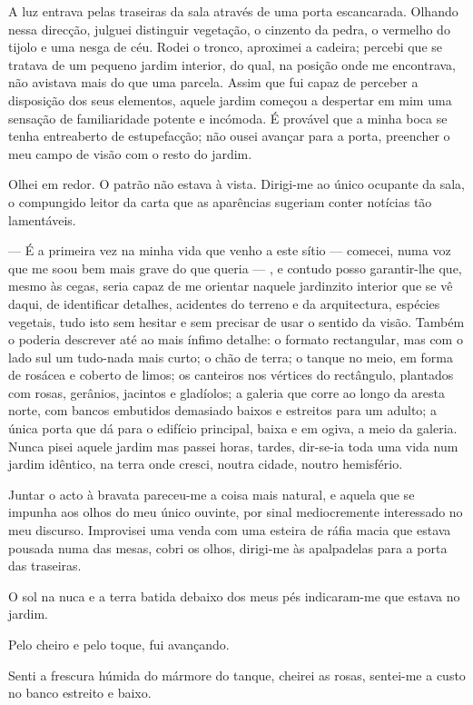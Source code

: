 A luz entrava pelas traseiras da sala através de uma porta escancarada.
Olhando nessa direcção, julguei distinguir vegetação, o cinzento da
pedra, o vermelho do tijolo e uma nesga de céu. Rodei o tronco,
aproximei a cadeira; percebi que se tratava de um pequeno jardim
interior, do qual, na posição onde me encontrava, não avistava mais do
que uma parcela. Assim que fui capaz de perceber a disposição dos seus
elementos, aquele jardim começou a despertar em mim uma sensação de
familiaridade potente e incómoda. É provável que a minha boca se tenha
entreaberto de estupefacção; não ousei avançar para a porta, preencher o
meu campo de visão com o resto do jardim.

Olhei em redor. O patrão não estava à vista. Dirigi-me ao único ocupante
da sala, o compungido leitor da carta que as aparências sugeriam conter
notícias tão lamentáveis.

--- É a primeira vez na minha vida que venho a este sítio
--- comecei, numa voz que me soou bem mais grave do que queria --- , e
  contudo posso garantir-lhe que, mesmo às cegas, seria capaz de me
  orientar naquele jardinzito interior que se vê daqui, de identificar
  detalhes, acidentes do terreno e da arquitectura, espécies vegetais,
  tudo isto sem hesitar e sem precisar de usar o sentido da visão.
  Também o poderia descrever até ao mais ínfimo detalhe: o formato
  rectangular, mas com o lado sul um tudo-nada mais curto; o
  chão de terra; o tanque no meio, em forma
de rosácea e coberto de limos; os canteiros nos vértices do rectângulo,
plantados com rosas, gerânios, jacintos e gladíolos; a galeria que corre
ao longo da aresta norte, com bancos embutidos demasiado baixos e
estreitos para um adulto; a única porta que dá para o edifício
principal, baixa e em ogiva, a meio da galeria. Nunca pisei aquele
jardim mas passei horas, tardes, dir-se-ia toda uma vida num jardim
idêntico, na terra onde cresci, noutra cidade, noutro hemisfério.

Juntar o acto à bravata pareceu-me a coisa mais natural, e aquela que se
impunha aos olhos do meu único ouvinte, por sinal mediocremente
interessado no meu discurso. Improvisei uma venda com uma esteira de
ráfia macia que estava pousada numa das mesas, cobri os olhos, dirigi-me
às apalpadelas para a porta das traseiras.

O sol na nuca e a terra batida debaixo dos meus pés indicaram-me que
estava no jardim.

Pelo cheiro e pelo toque, fui avançando.

Senti a frescura húmida do mármore do tanque, cheirei as rosas,
sentei-me a custo no banco estreito e baixo.

